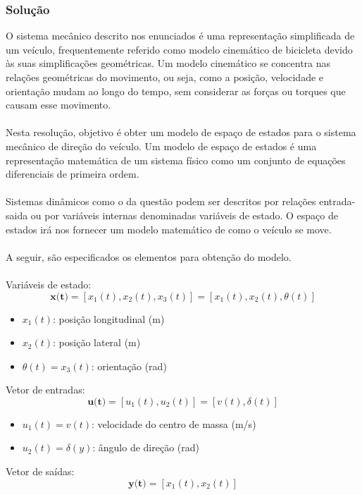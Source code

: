 \documentclass[a4paper,11pt]{article}
\begin{document}
\subsubsection*{\sc Solução}
O sistema mecânico descrito nos enunciados é uma representação simplificada de um veículo, frequentemente referido como modelo cinemático de bicicleta devido às suas simplificações geométricas. Um modelo cinemático se concentra nas relações geométricas do movimento, ou seja, como a posição, velocidade e orientação mudam ao longo do tempo, sem considerar as forças ou torques que causam esse movimento.
\\\\
Nesta resolução, objetivo é obter um modelo de espaço de estados para o sistema mecânico de direção do veículo. Um modelo de espaço de estados é uma representação matemática de um sistema físico como um conjunto de equações diferenciais de primeira ordem.
\\\\
Sistemas dinâmicos como o da questão podem ser descritos por relações entrada-saida ou por variáveis internas denominadas variáveis de estado. O espaço de estados irá nos fornecer um modelo matemático de como o veículo se move.
\\\\
A seguir, são especificados os elementos para obtenção do modelo.
\\\\
Variáveis de estado: 
\[
    \textbf{x(t)} = 
    [x_{1}(t), x_{2}(t), x_{3}(t)]
    =
    [x_{1}(t), x_{2}(t), \theta(t)]
\]
\begin{itemize}
    \item $x_1(t)$: posição longitudinal (m)
    \item $x_2(t)$: posição lateral (m)
    \item $\theta(t) = x_3(t)$: orientação (rad)
\end{itemize}

Vetor de entradas:
\[
    \textbf{u(t)} = 
    [u_{1}(t), u_{2}(t)]
    =
    [v(t), \delta(t)]
\]
\begin{itemize}
    \item $u_1(t) = v(t)$: velocidade do centro de massa (m/s)
    \item $u_2(t) = \delta(y)$: ângulo de direção (rad)
\end{itemize}

Vetor de saídas:
\[
    \textbf{y(t)} = [x_{1}(t), x_{2}(t)]
\]
\end{document}
